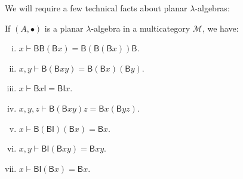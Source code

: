 \documentclass{llncs}
\begin{document}
We will require a few technical facts about planar $\lambda$-algebras:
\begin{lemma}\label{lem:lambda-algebra-facts}
  If $(A,\bullet)$ is a planar $\lambda$-algebra in a multicategory $\mathcal{M}$, we have:
  \begin{enumerate}[(i)]
  \item $x \vdash \mathsf{BB}(\mathsf{B}x) = \mathsf{B}(\mathsf{B}(\mathsf{B}x))\mathsf{B}$. 
  \item $x,y \vdash \mathsf{B}(\mathsf{B}xy) = \mathsf{B}(\mathsf{B}x)(\mathsf{B}y)$. 
  \item $x \vdash \mathsf{B}x\mathsf{I} = \mathsf{BI}x$. 
  \item $x,y,z \vdash \mathsf{B}(\mathsf{B}xy)z = \mathsf{B}x(\mathsf{B}yz)$.
  \item $x \vdash \mathsf{B}(\mathsf{BI})(\mathsf{B}x) = \mathsf{B}x$.
  \item $x,y \vdash \mathsf{BI}(\mathsf{B}xy) = \mathsf{B}xy$.
  \item $x \vdash \mathsf{BI}(\mathsf{B}x) = \mathsf{B}x$.
  \end{enumerate}
\end{lemma}
\end{document}
